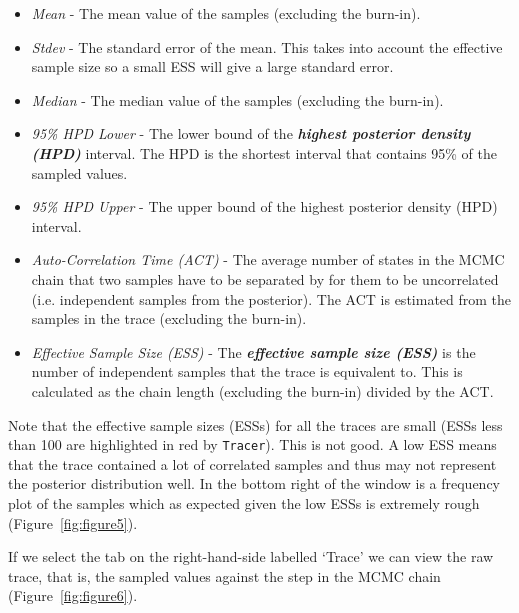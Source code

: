 \documentclass[cup7b, english]{cupbook}
\begin{document}
\begin{itemize}
\item \emph{Mean} -
The mean value of the samples (excluding the burn-in).
\item \emph{Stdev} -
The standard error of the mean. This takes into account the effective sample size so a
small ESS will give a large standard error.
\item \emph{Median} -
The median value of the samples (excluding the burn-in).
\item \emph{95\% HPD Lower} -
The lower bound of the \textbf{\textit{highest posterior density (HPD)}} interval. The HPD is the shortest interval
that contains 95\% of the sampled values.
\item \emph{95\% HPD Upper} -
The upper bound of the highest posterior density (HPD) interval. 
\item \emph{Auto-Correlation Time (ACT)} -
The average number of states in the MCMC chain that two samples have to be separated by for them
to be uncorrelated (i.e. independent samples from the posterior). The ACT is estimated from the
samples in the trace (excluding the burn-in).
\item \emph{Effective Sample Size (ESS)} -
The \textbf{\textit{effective sample size (ESS)}} is the number of independent samples that the trace is equivalent to. This is
calculated as the chain length (excluding the burn-in) divided by the ACT.
\end{itemize}

Note that the effective sample sizes (ESSs) for all the traces are small (ESSs less than
100 are highlighted in red by \texttt{Tracer}). This is not good. A low ESS means that the trace
contained a lot of correlated samples and thus may not represent the posterior distribution
well. In the bottom right of the window is a frequency plot of the samples which as
expected given the low ESSs is extremely rough (Figure~\ref{fig:figure5}).

If we select the tab on the right-hand-side labelled `Trace' we can view the raw trace,
that is, the sampled values against the  step in the MCMC chain (Figure~\ref{fig:figure6}).
\end{document}
